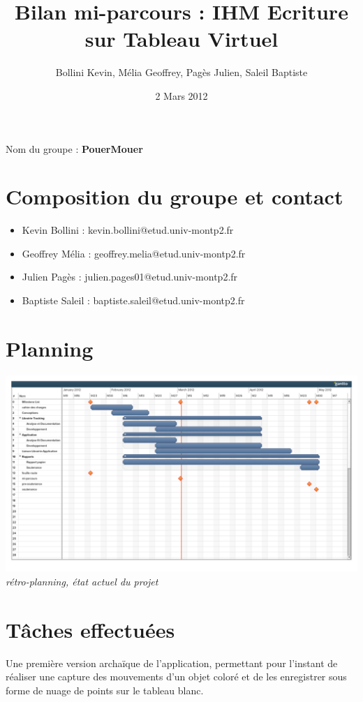 \documentclass{article}
\title{Bilan mi-parcours : IHM Ecriture sur Tableau Virtuel}
\author{Bollini Kevin, Mélia Geoffrey, Pagès Julien, Saleil Baptiste}
\date{2 Mars 2012}
\begin{document}
\maketitle
	Nom du groupe : \textbf{PouerMouer}
	\section{Composition du groupe et contact}
	
	\begin{itemize}
	\item Kevin Bollini : kevin.bollini@etud.univ-montp2.fr \\
	\item Geoffrey Mélia : geoffrey.melia@etud.univ-montp2.fr \\
	\item Julien Pagès : julien.pages01@etud.univ-montp2.fr \\
	\item Baptiste Saleil : baptiste.saleil@etud.univ-montp2.fr \\
	\end{itemize} 	
	\section{Planning}
		\begin{center}
			\includegraphics[scale=0.3]{retroplanning.pdf}
			\it rétro-planning, état actuel du projet
		\end{center}
	\section{Tâches effectuées}
		Une première version archaïque de l'application, permettant pour l'instant de réaliser une capture des mouvements d'un objet coloré et de les enregistrer sous forme de nuage de points sur le tableau blanc.
\end{document}
